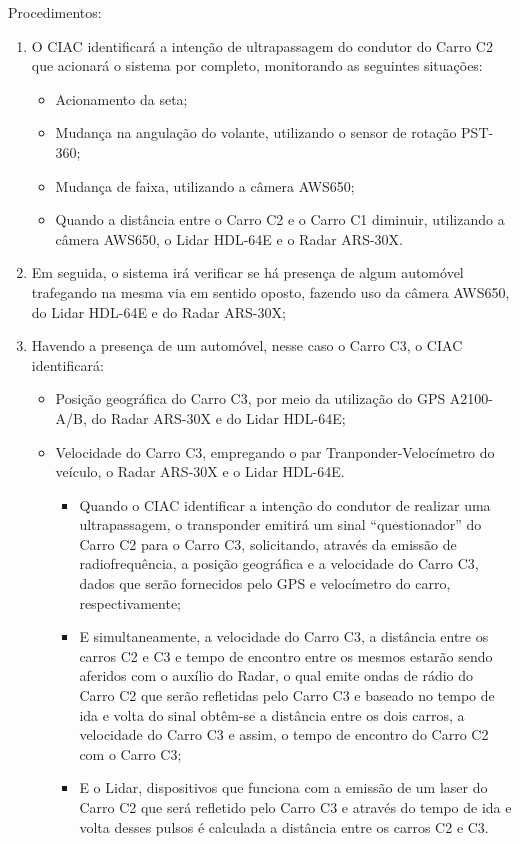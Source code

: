 Procedimentos:

\begin{enumerate}
  \item O CIAC identificará a intenção de ultrapassagem do condutor do Carro
  C2 que acionará o sistema por completo, monitorando as seguintes situações:
  \begin{itemize}
    \item Acionamento da seta;
    \item Mudança na angulação do volante, utilizando o sensor de rotação PST-360;
    \item Mudança de faixa, utilizando a câmera AWS650;
    \item Quando a distância entre o Carro C2 e o Carro C1 diminuir, utilizando a
    câmera AWS650, o Lidar HDL-64E e o Radar ARS-30X.
  \end{itemize}

  \item Em seguida, o sistema irá verificar se há presença de algum automóvel
  trafegando na mesma via em sentido oposto, fazendo uso da câmera AWS650, do
  Lidar HDL-64E e do Radar ARS-30X;

  \item Havendo a presença de um automóvel, nesse caso o Carro C3, o CIAC identificará:
  \begin{itemize}
    \item Posição geográfica do Carro C3, por meio da utilização do GPS
    A2100-A/B, do Radar ARS-30X e do Lidar HDL-64E;

    \item Velocidade do Carro C3, empregando o par Tranponder-Velocímetro do
    veículo, o Radar ARS-30X e o Lidar HDL-64E.
    \begin{itemize}
      \item Quando o CIAC identificar a intenção do condutor de realizar uma
      ultrapassagem, o transponder emitirá um sinal “questionador” do Carro C2
      para o Carro C3, solicitando, através da emissão de radiofrequência, a
      posição geográfica e a velocidade do Carro C3, dados que serão fornecidos
      pelo GPS e velocímetro do carro, respectivamente;

      \item E simultaneamente, a velocidade do Carro C3, a distância entre os
      carros C2 e C3 e tempo de encontro entre os mesmos estarão sendo aferidos
      com o auxílio do Radar, o qual emite ondas de rádio do Carro C2 que serão
      refletidas pelo Carro C3 e baseado no tempo de ida e volta do sinal
      obtêm-se a distância entre os dois carros, a velocidade do Carro C3 e
      assim, o tempo de encontro do Carro C2 com o Carro C3;

      \item E o Lidar, dispositivos que funciona com a emissão de um laser do
      Carro C2 que será refletido pelo Carro C3 e através do tempo de ida e
      volta desses pulsos é calculada a distância entre os carros C2 e C3.

    \end{itemize}
  \end{itemize}
\end{enumerate}
